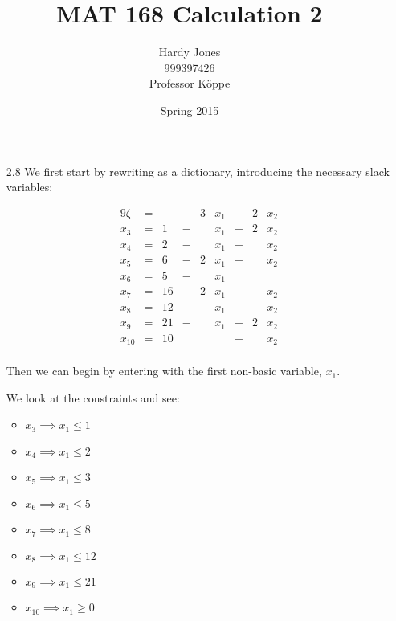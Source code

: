 \documentclass[12pt,letterpaper]{article}
\title{MAT 168 Calculation 2\vspace{-2ex}}
\author{Hardy Jones\\
        999397426\\
        Professor K\"{o}ppe\vspace{-2ex}}
\date{Spring 2015}
\newcommand*\seeconstraints{
  We look at the constraints and see:
}
\begin{document}
  \maketitle

  \begin{enumerate}
    \item [2.8]
      We first start by rewriting as a dictionary,
      introducing the necessary slack variables:

      \begin{alignat*}{9}
        \zeta  & {}={} &    &       & 3 & x_1 & {}+{} & 2 & x_2 \\
        x_3    & {}={} & 1  & {}-{} &   & x_1 & {}+{} & 2 & x_2 \\
        x_4    & {}={} & 2  & {}-{} &   & x_1 & {}+{} &   & x_2 \\
        x_5    & {}={} & 6  & {}-{} & 2 & x_1 & {}+{} &   & x_2 \\
        x_6    & {}={} & 5  & {}-{} &   & x_1 &       &   &     \\
        x_7    & {}={} & 16 & {}-{} & 2 & x_1 & {}-{} &   & x_2 \\
        x_8    & {}={} & 12 & {}-{} &   & x_1 & {}-{} &   & x_2 \\
        x_9    & {}={} & 21 & {}-{} &   & x_1 & {}-{} & 2 & x_2 \\
        x_{10} & {}={} & 10 &       &   &     & {}-{} &   & x_2 \\
      \end{alignat*}

      Then we can begin by entering with the first non-basic variable, $x_1$.

      \seeconstraints

      \begin{itemize}
        \item $x_3    \implies x_1 \leq 1$
        \item $x_4    \implies x_1 \leq 2$
        \item $x_5    \implies x_1 \leq 3$
        \item $x_6    \implies x_1 \leq 5$
        \item $x_7    \implies x_1 \leq 8$
        \item $x_8    \implies x_1 \leq 12$
        \item $x_9    \implies x_1 \leq 21$
        \item $x_{10} \implies x_1 \geq 0$
      \end{itemize}


\end{enumerate}
\end{document}
